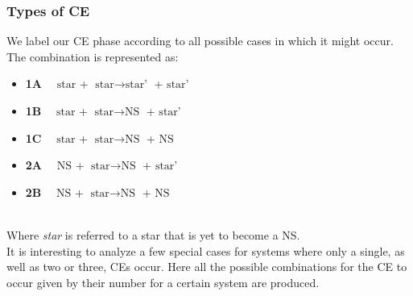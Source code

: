 \documentclass[preprint,12pt]{elsarticle}
\begin{document}
\subsubsection{\textbf{Types of CE}}
\label{sec:type_CE}

We label our CE phase according to all possible cases in which it might occur. The combination is represented as:
\begin{itemize}
    \item \textbf{1A} $\quad \text{star}$ + $\text{star} \rightarrow  \text{star'}$ + $\text{star'}$
    \item \textbf{1B} $\quad \text{star}$ + $\text{star} \rightarrow  \text{NS}$ + $\text{star'}$
    \item \textbf{1C} $\quad \text{star}$ + $\text{star} \rightarrow  \text{NS}$ + $\text{NS}$
    \item \textbf{2A} $\quad \text{NS}$ + $\text{star} \rightarrow  \text{NS}$ + $\text{star'}$
    \item \textbf{2B} $\quad \text{NS}$ + $\text{star} \rightarrow  \text{NS}$ + $\text{NS}$
\end{itemize}
\\

Where \textit{star} is referred to a star that is yet to become a NS.\\

It is interesting to analyze a few special cases for systems where only a single, as well as two or three, CEs occur. Here all the possible combinations for the CE to occur given by their number for a certain system are produced.
\end{document}
